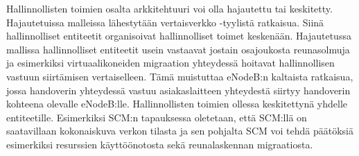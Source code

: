 Hallinnollisten toimien osalta arkkitehtuuri voi olla hajautettu tai keskitetty. 
Hajautetuissa malleissa lähestytään vertaisverkko -tyylistä ratkaisua. Siinä hallinnolliset entiteetit organisoivat hallinnolliset toimet keskenään. Hajautetussa mallissa hallinnolliset entiteetit usein vastaavat jostain osajoukosta reunasolmuja ja esimerkiksi virtuaalikoneiden migraation yhteydessä hoitavat hallinnollisen vastuun siirtämisen vertaiselleen. 
Tämä muistuttaa eNodeB:n kaltaista ratkaisua, jossa handoverin yhteydessä vastuu asiakaslaitteen yhteydestä siirtyy handoverin kohteena olevalle eNodeB:lle. 
Hallinnollisten toimien ollessa keskitettynä yhdelle entiteetille. Esimerkiksi SCM:n \cite{lobillo15scc} tapauksessa oletetaan, että SCM:llä on saatavillaan kokonaiskuva verkon tilasta ja sen pohjalta SCM voi tehdä päätöksiä esimerkiksi resurssien käyttöönotosta sekä reunalaskennan migraatiosta. 


